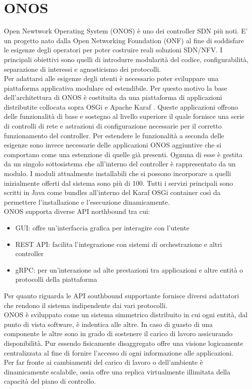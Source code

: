\chapter{ONOS}
Open Newtwork Operating System (ONOS) \cite{ONOS} è uno dei controller SDN più noti. 
E' un progetto nato dalla Open Networking Foundation (ONF) \cite{ONF} al fine di soddisfare le esigenze degli operatori per poter costruire reali soluzioni SDN/NFV.
I principali obiettivi sono quelli di introdurre modularità del codice, configurabilità, separazione di interessi e agnosticismo dei protocolli.
\\Per adattarsi alle esigenze degli utenti è necessario poter sviluppare una piattaforma applicativa modulare ed estendibile.
Per questo motivo la base dell'architettura di ONOS è costituita da una piattaforma di applicazioni distributite collocata sopra OSGi \cite{osgi} e Apache Karaf \cite{Apache}. 
Queste applicazioni offrono delle funzionalità di base e sostegno al livello superiore il quale fornisce una serie di controlli di rete e astrazioni di configurazione necessarie per il corretto funzionamento del controller.
Per estendere le funzionalità a seconda delle esigenze sono invece necessarie delle applicazioni ONOS aggiuntive che si comportano come una estenzione di quelle già presenti. 
Ognuna di esse è gestita da un singolo sottosistema che all'interno del controller è rappresentato da un modulo.
I moduli attualmente installabili che si possono incorporare a quelli inizialmente offerti dal sistema sono più di 100.
Tutti i servizi principali sono scritti in Java come bundles all'interno del Karaf OSGi container così da permettere l'installazione e l'esecuzione dinamicamente.
\\ONOS supporta diverse API northbound tra cui:
\begin{itemize}
\item GUI: offre un'interfaccia grafica per interagire con l'utente
\item REST API: facilita l'integrazione con sistemi di orchestrazione e altri controller 
\item gRPC: per un'interazione ad alte prestazioni tra applicazioni e altre entità o protocolli della piattaforma
\end{itemize}
Per quanto riguarda le API southbound supportante fornisce diversi adattatori che rendono il sistema indipendente dai vari protocolli.
\\ONOS è sviluppato come un sistema simmetrico distribuito in cui ogni entità, dal punto di vista software, è indentica alle altre. 
In caso di guasto di una componente le altre sono in grado di sostenere il carico di lavoro assicurando disponibilità.
Pur essendo fisicamente disaggregato offre una visione logicamente centralizzata al fine di fornire l'accesso di ogni informazione alle applicazioni.
\\Per far fronte ai cambiamenti del carico di lavoro o dell'ambiente è dinamicamente scalabile, ossia offre una replica virtualmente illimitata della capacità del piano di controllo.

